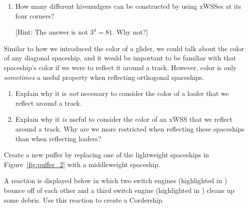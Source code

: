 \begin{multicols}{2}
\begin{problem}
\begin{enumerate}[label=\bf\color{ocre}(\alph*)]
			\item {} How many different hivenudgers can be constructed by using xWSSes at its four corners?
			
			[Hint: The answer is not $3^4 = 81$. Why not?]
		\end{enumerate}
	\end{problem}
	
	
	\mfilbreak
	
	
	\begin{problem}\label{exer:no_orthogonal_color} 
		Similar to how we introduced the color of a glider, we could talk about the color of any diagonal spaceship, and it would be important to be familiar with that spaceship's color if we were to reflect it around a track. However, color is only \emph{sometimes} a useful property when reflecting orthogonal spaceships.\smallskip
		
		\begin{enumerate}[label=\bf\color{ocre}(\alph*)]
			\item Explain why it is \emph{not} necessary to consider the color of a loafer that we reflect around a track.
			
			\item Explain why it \emph{is} useful to consider the color of an xWSS that we reflect around a track. Why are we more restricted when reflecting these spaceships than when reflecting loafers?
		\end{enumerate}
	\end{problem}
	
	
	\mfilbreak
	
	
	\begin{problem}\label{exer:puffer_2} 
		Create a new puffer by replacing one of the lightweight spaceships in Figure~\ref{fig:puffer_2} with a middleweight spaceship.
	\end{problem}
	
	
	\mfilbreak
	
	
	\begin{problemstar}\label{exer:switch_engine_reaction} 
		A reaction is displayed below in which two switch engines (highlighted in ) bounce off of each other and a third switch engine (highlighted in ) cleans up some debris. Use this reaction to create a Cordership.
		

\end{problemstar}
\end{multicols}
